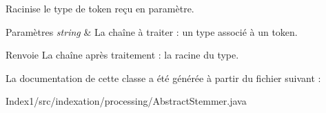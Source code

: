 Racinise le type de token reçu en paramètre.


\begin{DoxyParams}{Paramètres}
{\em string} & La chaîne à traiter \+: un type associé à un token. \\
\hline
\end{DoxyParams}
\begin{DoxyReturn}{Renvoie}
La chaîne après traitement \+: la racine du type. 
\end{DoxyReturn}


La documentation de cette classe a été générée à partir du fichier suivant \+:\begin{DoxyCompactItemize}
\item 
Index1/src/indexation/processing/Abstract\+Stemmer.\+java\end{DoxyCompactItemize}
